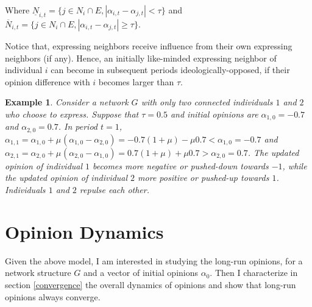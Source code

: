 \documentclass{article}
\newtheorem{example}{Example}
\begin{document}
Where $\underline{N}_{i,t} =\{ j \in N_i \cap E, |\alpha_{i,t} - \alpha_{j,t}| < \tau\}$ and $\overline{N}_{i,t} =\{ j \in N_i \cap E, |\alpha_{i,t} - \alpha_{j,t}| \geq \tau\}$. 

\bigskip

\noindent Notice that, expressing neighbors receive influence from their own expressing neighbors (if any). Hence, an initially like-minded expressing neighbor of individual $i$ can become in subsequent periods ideologically-opposed, if their opinion difference with $i$ becomes larger than $\tau$.
\smallskip



\begin{example} Consider a network $G$ with only two connected individuals $1$ and $2$ who choose to express. Suppose that $\tau=0.5$ and initial opinions are  $\alpha_{1,0}=-0.7$ and $\alpha_{2,0}=0.7$. In period $t=1$, $\alpha_{1,1} = \alpha_{1,0} + \mu_{} ( \alpha_{1,0} - \alpha_{2,0}) =  -0.7 (1 + \mu) - \mu 0.7 < \alpha_{1,0} = -0.7 $ and  $\alpha_{2,1} = \alpha_{2,0} + \mu_{} ( \alpha_{2,0} - \alpha_{1,0}) = 0.7 (1+\mu) + \mu 0.7 > \alpha_{2,0} =0.7$. The updated opinion of individual $1$ becomes more negative or pushed-down towards $-1$, while the updated opinion of individual $2$ more positive or pushed-up towards $1$. Individuals $1$ and $2$ repulse each other. 
\end{example} 





\section{Opinion Dynamics} \label{eq}

Given the above model, I am interested in studying the long-run opinions, for a network structure $G$ and a vector of initial opinions $\alpha_0$. Then I characterize in section \ref{convergence} the overall dynamics of opinions and show that long-run opinions always converge.  
\end{document}
